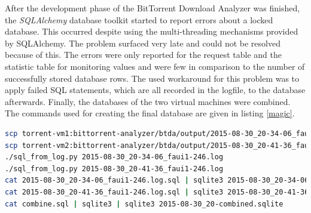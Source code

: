 \documentclass[10pt, a4paper, twoside, headsepline]{scrbook}
\renewcommand{\_}{\origunderscore\allowbreak}
\begin{document}
After the development phase of the BitTorrent Download Analyzer was finished, the \emph{SQLAlchemy} database toolkit started to report errors about a locked database. This occurred despite using the multi-threading mechanisms provided by SQLAlchemy. The problem surfaced very late and could not be resolved because of this. The errors were only reported for the request table and the statistic table for monitoring values and were few in comparison to the number of successfully stored database rows. The used workaround for this problem was to apply failed SQL statements, which are all recorded in the logfile, to the database afterwards. Finally, the databases of the two virtual machines were combined. The commands used for creating the final database are given in listing \ref{magic}.
\begin{lstlisting}[language=bash, otherkeywords={scp, sqlite3}, float, caption={[Creating the final database]Steps to create the final database. The \texttt{combine.sql} scripts produces \texttt{INSERT} statments for all table rows of both databases and handles torrent IDs appropriately. Filename timestamps are in CEST, which is UTC+02:00. \texttt{2015-08-30\_20-combined.sqlite} holds the data used for the evaluation.}, captionpos=b, label=magic]
scp torrent-vm1:bittorrent-analyzer/btda/output/2015-08-30_20-34-06_faui1-246* .
scp torrent-vm2:bittorrent-analyzer/btda/output/2015-08-30_20-41-36_faui1-246* .
./sql_from_log.py 2015-08-30_20-34-06_faui1-246.log
./sql_from_log.py 2015-08-30_20-41-36_faui1-246.log
cat 2015-08-30_20-34-06_faui1-246.log.sql | sqlite3 2015-08-30_20-34-06_faui1-246.sqlite
cat 2015-08-30_20-41-36_faui1-246.log.sql | sqlite3 2015-08-30_20-41-36_faui1-246.sqlite
cat combine.sql | sqlite3 | sqlite3 2015-08-30_20-combined.sqlite
\end{lstlisting}
\end{document}
